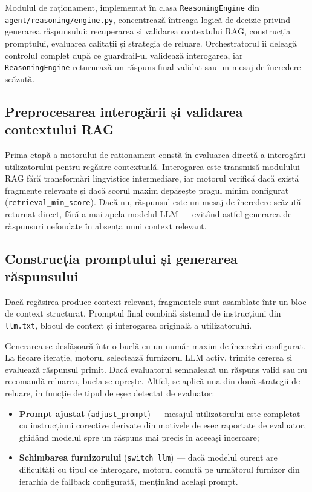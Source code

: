\documentclass[12pt, a4paper, oneside, romanian]{teza-upb}
\begin{document}
Modulul de raționament, implementat în clasa \texttt{ReasoningEngine} din \texttt{agent/reasoning/engine.py}, concentrează întreaga logică de decizie privind generarea răspunsului: recuperarea și validarea contextului RAG, construcția promptului, evaluarea calității și strategia de reluare. Orchestratorul îi deleagă controlul complet după ce guardrail-ul validează interogarea, iar \texttt{ReasoningEngine} returnează un răspuns final validat sau un mesaj de încredere scăzută.

\subsection{Preprocesarea interogării și validarea contextului RAG}

Prima etapă a motorului de raționament constă în evaluarea directă a interogării utilizatorului pentru regăsire contextuală. Interogarea este transmisă modulului RAG fără transformări lingvistice intermediare, iar motorul verifică dacă există fragmente relevante și dacă scorul maxim depășește pragul minim configurat (\texttt{retrieval\_min\_score}). Dacă nu, răspunsul este un mesaj de încredere scăzută returnat direct, fără a mai apela modelul LLM — evitând astfel generarea de răspunsuri nefondate în absența unui context relevant.

\subsection{Construcția promptului și generarea răspunsului}

Dacă regăsirea produce context relevant, fragmentele sunt asamblate într-un bloc de context structurat. Promptul final combină sistemul de instrucțiuni din \texttt{llm.txt}, blocul de context și interogarea originală a utilizatorului.

Generarea se desfășoară într-o buclă cu un număr maxim de încercări configurat. La fiecare iterație, motorul selectează furnizorul LLM activ, trimite cererea și evaluează răspunsul primit. Dacă evaluatorul semnalează un răspuns valid sau nu recomandă reluarea, bucla se oprește. Altfel, se aplică una din două strategii de reluare, în funcție de tipul de eșec detectat de evaluator:

\begin{itemize}
    \item \textbf{Prompt ajustat} (\texttt{adjust\_prompt}) — mesajul utilizatorului este completat cu instrucțiuni corective derivate din motivele de eșec raportate de evaluator, ghidând modelul spre un răspuns mai precis în aceeași încercare;
    \item \textbf{Schimbarea furnizorului} (\texttt{switch\_llm}) — dacă modelul curent are dificultăți cu tipul de interogare, motorul comută pe următorul furnizor din ierarhia de fallback configurată, menținând același prompt.
\end{itemize}
\end{document}
